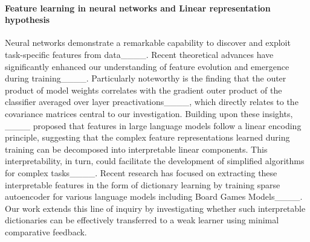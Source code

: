 \paragraph{Feature learning in neural networks and Linear representation hypothesis}
Neural networks demonstrate a remarkable capability to discover and exploit task-specific features from data____. Recent theoretical advances have significantly enhanced our understanding of feature evolution and emergence during training____. Particularly noteworthy is the finding that the outer product of model weights correlates with the gradient outer product of the classifier averaged over layer preactivations____, which directly relates to the covariance matrices central to our investigation. Building upon these insights, ____ proposed that features in large language models follow a linear encoding principle, suggesting that the complex feature representations learned during training can be decomposed into interpretable linear components. This interpretability, in turn, could facilitate the development of simplified algorithms for complex tasks____. Recent research has focused on extracting these interpretable features in the form of dictionary learning by training sparse autoencoder for various language models including Board Games Models____. Our work extends this line of inquiry by investigating whether such interpretable dictionaries can be effectively transferred to a weak learner using minimal comparative feedback.

